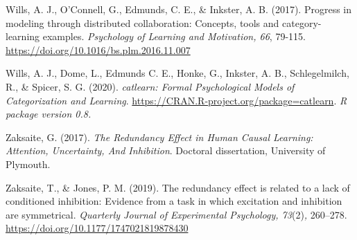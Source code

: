 \documentclass[twocolumn]{article}
\begin{document}
\begin{hangparas}{1em}{1}
Wills, A. J., O'Connell, G., Edmunds, C. E., \& Inkster, A. B. (2017).
Progress in modeling through distributed collaboration: Concepts, tools
and category-learning examples. \emph{Psychology of Learning and
Motivation, 66}, 79-115. \url{https://doi.org/10.1016/bs.plm.2016.11.007}

Wills, A. J., Dome, L., Edmunds C. E., Honke, G., Inkster, A. B.,
Schlegelmilch, R., \& Spicer, S. G. (2020). \emph{catlearn: Formal
Psychological Models of Categorization and Learning}.
\url{https://CRAN.R-project.org/package=catlearn}. \emph{R package
version 0.8.}

Zaksaite, G. (2017). \emph{The Redundancy Effect in Human Causal Learning:
Attention, Uncertainty, And Inhibition}. Doctoral dissertation,
University of Plymouth.

Zaksaite, T., \& Jones, P. M. (2019). The redundancy effect is related
to a lack of conditioned inhibition: Evidence from a task in which
excitation and inhibition are symmetrical. \emph{Quarterly Journal of
Experimental Psychology, 73}(2)\emph{, }260--278.
\url{https://doi.org/10.1177/1747021819878430}

\end{hangparas}
\end{document}
